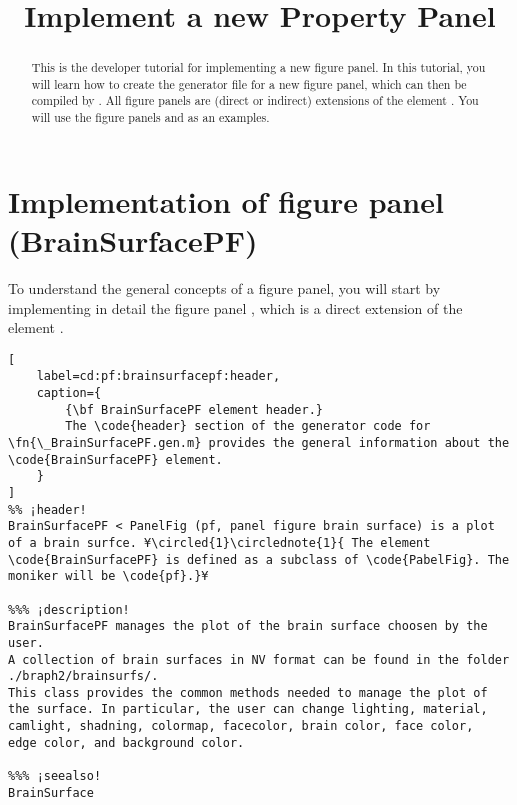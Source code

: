 \documentclass{tufte-handout}
\title{Implement a new Property Panel}
\begin{document}
\maketitle

\begin{abstract}
\noindent
This is the developer tutorial for implementing a new figure panel. 
In this tutorial, you will learn how to create the generator file  for a new figure panel, which can then be compiled by . 
All figure panels are (direct or indirect) extensions of the element .
You will use the figure panels  and  as an examples.
\end{abstract}

\tableofcontents

\clearpage

\section{Implementation of figure panel (BrainSurfacePF)}

To understand the general concepts of a figure panel, you will start by implementing in detail the figure panel , which is a direct extension of the element .

\begin{lstlisting}[
	label=cd:pf:brainsurfacepf:header,
	caption={
		{\bf BrainSurfacePF element header.}
		The \code{header} section of the generator code for \fn{\_BrainSurfacePF.gen.m} provides the general information about the \code{BrainSurfacePF} element.
	}
]
%% ¡header!
BrainSurfacePF < PanelFig (pf, panel figure brain surface) is a plot of a brain surfce. ¥\circled{1}\circlednote{1}{ The element \code{BrainSurfacePF} is defined as a subclass of \code{PabelFig}. The moniker will be \code{pf}.}¥

%%% ¡description!
BrainSurfacePF manages the plot of the brain surface choosen by the user. 
A collection of brain surfaces in NV format can be found in the folder 
./braph2/brainsurfs/.
This class provides the common methods needed to manage the plot of 
the surface. In particular, the user can change lighting, material, 
camlight, shadning, colormap, facecolor, brain color, face color, 
edge color, and background color. 

%%% ¡seealso!
BrainSurface
\end{lstlisting}
\end{document}
